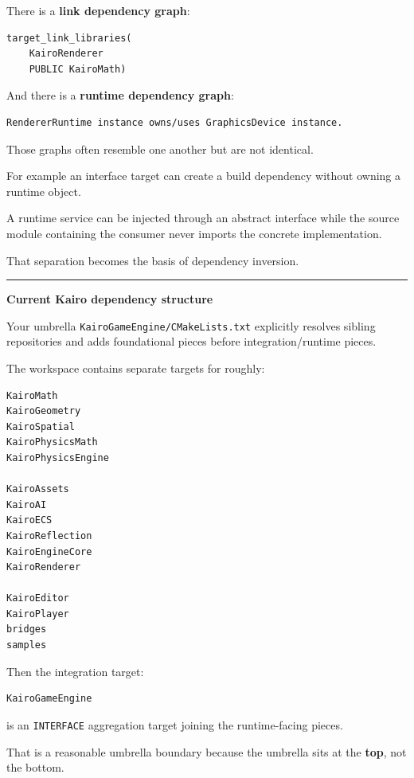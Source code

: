 There is a \textbf{link dependency graph}:

\begin{verbatim}
target_link_libraries(
    KairoRenderer
    PUBLIC KairoMath)
\end{verbatim}

And there is a \textbf{runtime dependency graph}:

\begin{verbatim}
RendererRuntime instance owns/uses GraphicsDevice instance.
\end{verbatim}

Those graphs often resemble one another but are not identical.

For example an interface target can create a build dependency without owning a runtime object.

A runtime service can be injected through an abstract interface while the source module containing the consumer never imports the concrete implementation.

That separation becomes the basis of dependency inversion.

\begin{center}\rule{0.5\linewidth}{0.5pt}\end{center}

\textbf{Current Kairo dependency structure}

Your umbrella \texttt{KairoGameEngine/CMakeLists.txt} explicitly resolves sibling repositories and adds foundational pieces before integration/runtime pieces.

The workspace contains separate targets for roughly:

\begin{verbatim}
KairoMath
KairoGeometry
KairoSpatial
KairoPhysicsMath
KairoPhysicsEngine

KairoAssets
KairoAI
KairoECS
KairoReflection
KairoEngineCore
KairoRenderer

KairoEditor
KairoPlayer
bridges
samples
\end{verbatim}

Then the integration target:

\begin{verbatim}
KairoGameEngine
\end{verbatim}

is an \texttt{INTERFACE} aggregation target joining the runtime-facing pieces.

That is a reasonable umbrella boundary because the umbrella sits at the \textbf{top}, not the bottom.

